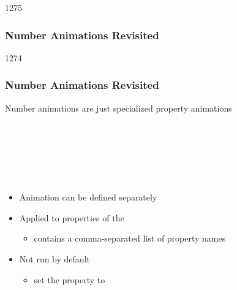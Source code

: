 \begin{slide}{1275}\frametitle{Number Animations Revisited}



\end{slide}


\begin{slide}{1274}\frametitle{Number Animations Revisited}

Number animations are just specialized property animations

\vspace*{0.5em}
\begin{qml}
\\
\\
\\
\\
\\
\qtt{\}}
\end{qml}

\vspace*{0.5em}
\begin{itemize}
\item Animation can be defined separately
\item Applied to properties of the 
  \begin{itemize}
  \item {} contains a comma-separated list of property names
  \end{itemize}
\item Not run by default
  \begin{itemize}
  \item set the  property to 
  \end{itemize}
\end{itemize}

\end{slide}

